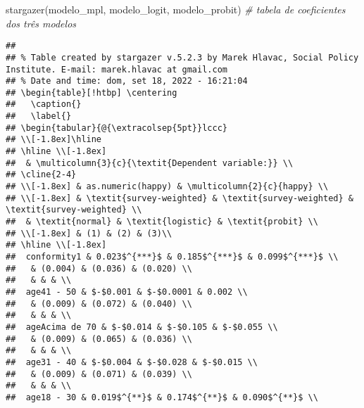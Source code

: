 \documentclass[
]{article}
\newenvironment{Shaded}{\begin{snugshade}}{\end{snugshade}}
\newcommand{\CommentTok}[1]{\textcolor[rgb]{0.56,0.35,0.01}{\textit{#1}}}
\newcommand{\FunctionTok}[1]{\textcolor[rgb]{0.00,0.00,0.00}{#1}}
\newcommand{\NormalTok}[1]{#1}
\begin{document}
\begin{Shaded}
\begin{Highlighting}[]
\FunctionTok{stargazer}\NormalTok{(modelo\_mpl, modelo\_logit, modelo\_probit) }\CommentTok{\# tabela de coeficientes dos três modelos}
\end{Highlighting}
\end{Shaded}

\begin{verbatim}
## 
## % Table created by stargazer v.5.2.3 by Marek Hlavac, Social Policy Institute. E-mail: marek.hlavac at gmail.com
## % Date and time: dom, set 18, 2022 - 16:21:04
## \begin{table}[!htbp] \centering 
##   \caption{} 
##   \label{} 
## \begin{tabular}{@{\extracolsep{5pt}}lccc} 
## \\[-1.8ex]\hline 
## \hline \\[-1.8ex] 
##  & \multicolumn{3}{c}{\textit{Dependent variable:}} \\ 
## \cline{2-4} 
## \\[-1.8ex] & as.numeric(happy) & \multicolumn{2}{c}{happy} \\ 
## \\[-1.8ex] & \textit{survey-weighted} & \textit{survey-weighted} & \textit{survey-weighted} \\ 
##  & \textit{normal} & \textit{logistic} & \textit{probit} \\ 
## \\[-1.8ex] & (1) & (2) & (3)\\ 
## \hline \\[-1.8ex] 
##  conformity1 & 0.023$^{***}$ & 0.185$^{***}$ & 0.099$^{***}$ \\ 
##   & (0.004) & (0.036) & (0.020) \\ 
##   & & & \\ 
##  age41 - 50 & $-$0.001 & $-$0.0001 & 0.002 \\ 
##   & (0.009) & (0.072) & (0.040) \\ 
##   & & & \\ 
##  ageAcima de 70 & $-$0.014 & $-$0.105 & $-$0.055 \\ 
##   & (0.009) & (0.065) & (0.036) \\ 
##   & & & \\ 
##  age31 - 40 & $-$0.004 & $-$0.028 & $-$0.015 \\ 
##   & (0.009) & (0.071) & (0.039) \\ 
##   & & & \\ 
##  age18 - 30 & 0.019$^{**}$ & 0.174$^{**}$ & 0.090$^{**}$ \\ 

\end{verbatim}
\end{document}
